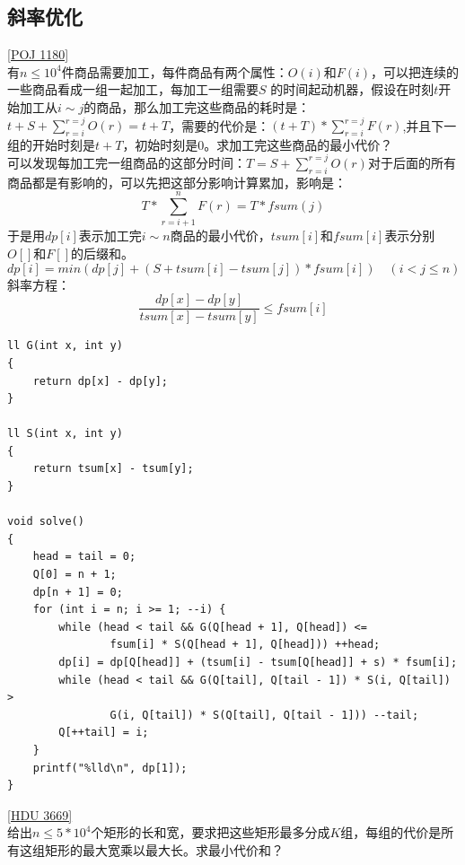 \subsection{斜率优化}
\underline {[POJ 1180]} \\

有$n\leq 10^4$件商品需要加工，每件商品有两个属性：$O(i)$和$F(i)$，可以把连续的一些商品看成一组一起加工，每加工一组需要$S$ 的时间起动机器，假设在时刻$t$开始加工从$i\sim j$的商品，那么加工完这些商品的耗时是：$t+S+\sum_{r=i}^{r=j}{O(r)}=t+T$，需要的代价是：$(t+T)*\sum_{r=i}^{r=j}{F(r)}$,并且下一组的开始时刻是$t+T$，初始时刻是0。求加工完这些商品的最小代价？ \\

可以发现每加工完一组商品的这部分时间：$T=S+\sum_{r=i}^{r=j}{O(r)}$对于后面的所有商品都是有影响的，可以先把这部分影响计算累加，影响是：
$$T*\sum_{r=i+1}^{n}{F(r)}=T*fsum(j)$$
于是用$dp[i]$表示加工完$i\sim n$商品的最小代价，$tsum[i]$和$fsum[i]$表示分别$O[]$和$F[]$的后缀和。
$$
dp[i]=min(dp[j]+(S+tsum[i]-tsum[j])*fsum[i])\quad (i< j\leq n)
$$
斜率方程：
$$
\frac{dp[x]-dp[y]}{tsum[x]-tsum[y]}\leq fsum[i]
$$

\begin{lstlisting}
ll G(int x, int y)
{
	return dp[x] - dp[y];
}

ll S(int x, int y)
{
	return tsum[x] - tsum[y];
}

void solve()
{
	head = tail = 0;
	Q[0] = n + 1;
	dp[n + 1] = 0;
	for (int i = n; i >= 1; --i) {
		while (head < tail && G(Q[head + 1], Q[head]) <=
				fsum[i] * S(Q[head + 1], Q[head])) ++head;
		dp[i] = dp[Q[head]] + (tsum[i] - tsum[Q[head]] + s) * fsum[i];
		while (head < tail && G(Q[tail], Q[tail - 1]) * S(i, Q[tail]) >
				G(i, Q[tail]) * S(Q[tail], Q[tail - 1])) --tail;
		Q[++tail] = i;
	}
	printf("%lld\n", dp[1]);
}
\end{lstlisting}

\underline {[HDU 3669]} \\

给出$n\leq 5*10^4$个矩形的长和宽，要求把这些矩形最多分成$K$组，每组的代价是所有这组矩形的最大宽乘以最大长。求最小代价和？\\

